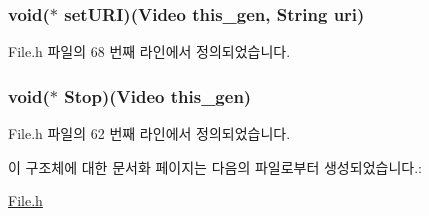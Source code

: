 \hypertarget{struct___video_a1b806abc2d87bcfdb8fc81eeb349062e}{
\subsubsection[{set\-U\-R\-I}]{\setlength{\rightskip}{0pt plus 5cm}void($\ast$  set\-U\-R\-I)({\bf Video} this\-\_\-gen, {\bf String} uri)}}\label{struct___video_a1b806abc2d87bcfdb8fc81eeb349062e}


File.\-h 파일의 68 번째 라인에서 정의되었습니다.

\hypertarget{struct___video_ad9c252b2b06ead2f188d91339e651485}{
\subsubsection[{Stop}]{\setlength{\rightskip}{0pt plus 5cm}void($\ast$  Stop)({\bf Video} this\-\_\-gen)}}\label{struct___video_ad9c252b2b06ead2f188d91339e651485}


File.\-h 파일의 62 번째 라인에서 정의되었습니다.



이 구조체에 대한 문서화 페이지는 다음의 파일로부터 생성되었습니다.\-:\begin{DoxyCompactItemize}
\item 
\hyperlink{_file_8h}{File.\-h}\end{DoxyCompactItemize}

